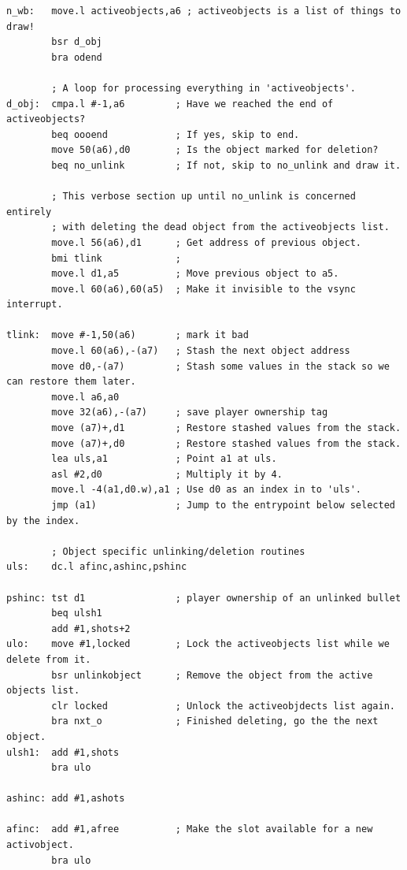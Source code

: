 \begin{lstlisting}
n_wb:   move.l activeobjects,a6 ; activeobjects is a list of things to draw!
        bsr d_obj
        bra odend

        ; A loop for processing everything in 'activeobjects'.
d_obj:  cmpa.l #-1,a6         ; Have we reached the end of activeobjects?
        beq oooend            ; If yes, skip to end.
        move 50(a6),d0        ; Is the object marked for deletion?
        beq no_unlink         ; If not, skip to no_unlink and draw it.
    
        ; This verbose section up until no_unlink is concerned entirely
        ; with deleting the dead object from the activeobjects list.
        move.l 56(a6),d1      ; Get address of previous object.
        bmi tlink             ; 
        move.l d1,a5          ; Move previous object to a5.
        move.l 60(a6),60(a5)  ; Make it invisible to the vsync interrupt.
    
tlink:  move #-1,50(a6)       ; mark it bad
        move.l 60(a6),-(a7)   ; Stash the next object address
        move d0,-(a7)         ; Stash some values in the stack so we can restore them later.
        move.l a6,a0
        move 32(a6),-(a7)     ; save player ownership tag
        move (a7)+,d1         ; Restore stashed values from the stack.
        move (a7)+,d0         ; Restore stashed values from the stack.
        lea uls,a1            ; Point a1 at uls.
        asl #2,d0             ; Multiply it by 4.
        move.l -4(a1,d0.w),a1 ; Use d0 as an index in to 'uls'.
        jmp (a1)              ; Jump to the entrypoint below selected by the index.
    
        ; Object specific unlinking/deletion routines
uls:    dc.l afinc,ashinc,pshinc
    
pshinc: tst d1                ; player ownership of an unlinked bullet
        beq ulsh1
        add #1,shots+2
ulo:    move #1,locked        ; Lock the activeobjects list while we delete from it.
        bsr unlinkobject      ; Remove the object from the active objects list.
        clr locked            ; Unlock the activeobjdects list again.
        bra nxt_o             ; Finished deleting, go the the next object.
ulsh1:  add #1,shots
        bra ulo
    
ashinc: add #1,ashots
    
afinc:  add #1,afree          ; Make the slot available for a new activobject.
        bra ulo
    

\end{lstlisting}
